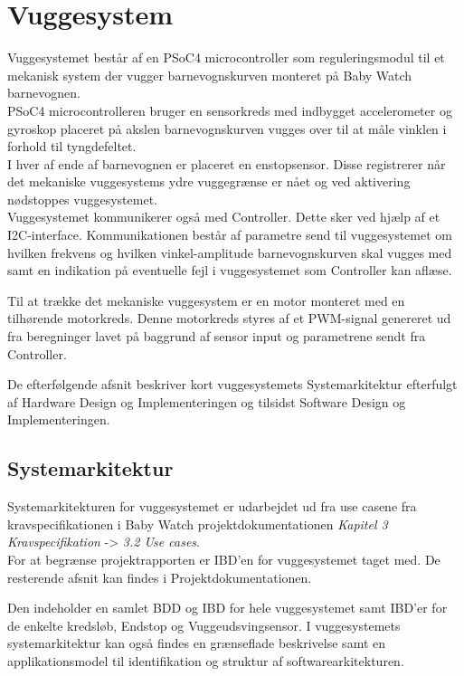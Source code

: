 \chapter{Vuggesystem}
\label{vuggesys}
Vuggesystemet består af en PSoC4 microcontroller som reguleringsmodul til et mekanisk system der vugger barnevognskurven monteret på Baby Watch barnevognen. \\ PSoC4 microcontrolleren bruger en sensorkreds med indbygget accelerometer og gyroskop placeret på akslen barnevognskurven vugges over til at måle vinklen i forhold til tyngdefeltet. \\ I hver af ende af barnevognen er placeret en enstopsensor. Disse registrerer når det mekaniske vuggesystems ydre vuggegrænse er nået og ved aktivering nødstoppes vuggesystemet. \\ Vuggesystemet kommunikerer også med Controller. Dette sker ved hjælp af et I2C-interface. Kommunikationen består af parametre send til vuggesystemet om hvilken frekvens og hvilken vinkel-amplitude barnevognskurven skal vugges med samt en indikation på eventuelle fejl i vuggesystemet som Controller kan aflæse.

Til at trække det mekaniske vuggesystem er en motor monteret med en tilhørende motorkreds. Denne motorkreds styres af et PWM-signal genereret ud fra beregninger lavet på baggrund af sensor input og parametrene sendt fra Controller.

De efterfølgende afsnit beskriver kort vuggesystemets Systemarkitektur efterfulgt af Hardware Design og Implementeringen og tilsidst Software Design og Implementeringen.

\section{Systemarkitektur}
\label{vs_sysark}
Systemarkitekturen for vuggesystemet er udarbejdet ud fra use casene fra kravspecifikationen i Baby Watch projektdokumentationen \textit{Kapitel 3 Kravspecifikation} -> \textit{3.2 Use cases}. \\ For at begrænse projektrapporten er IBD'en for vuggesystemet taget med. De resterende afsnit kan findes i Projektdokumentationen.


Den indeholder en samlet BDD og IBD for hele vuggesystemet samt IBD'er for de enkelte kredsløb, Endstop og Vuggeudsvingsensor. I vuggesystemets systemarkitektur kan også findes en grænseflade beskrivelse samt en applikationsmodel til identifikation og struktur af softwarearkitekturen.

